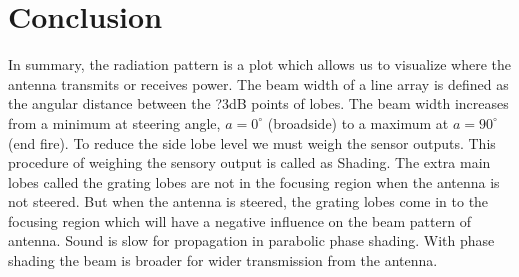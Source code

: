 \chapter*{Conclusion}

\noindent In summary, the radiation pattern is a plot which allows us to visualize where the antenna transmits or receives power. The beam width of a line array is defined as the angular distance between the ?3dB points of lobes. The beam width increases from a minimum at steering angle, $a = 0^{\circ}$ (broadside) to a maximum at $a = 90^{\circ}$ (end fire). To reduce the side lobe level we must weigh the sensor outputs. This procedure of weighing the sensory output is called as Shading. The extra main lobes called the grating lobes are not in the focusing region when the antenna is not steered. But when the antenna is steered, the grating lobes come in to the focusing region which will have a negative influence on the beam pattern of antenna. Sound is slow for propagation in parabolic phase shading. With phase shading the beam is broader for wider transmission from the antenna.